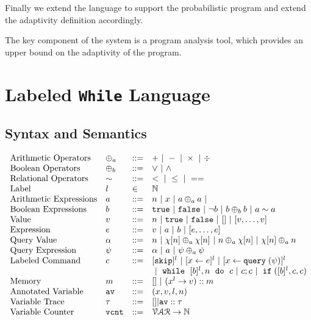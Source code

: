 \documentclass[a4paper,11pt]{article}
\begin{document}
Finally we extend the language to support the probabilistic program and extend the adaptivity definition accordingly.


The key component of the system is a program analysis tool, which provides an upper bound on the adaptivity of the program.

\section{Labeled {\tt While} Language}
\label{sec:while_language}
%
\subsection{Syntax and Semantics}
%
\[
\begin{array}{llll}
 \mbox{Arithmetic Operators} & \oplus_a & ::= & + ~|~ - ~|~ \times 
%
~|~ \div \\  
  \mbox{Boolean Operators} & \oplus_b & ::= & \lor ~|~ \land \\
   \mbox{Relational Operators} & \sim & ::= & < ~|~ \leq ~|~ == \\  
   \mbox{Label} & l & \in &  \mathbb{N}  \\  
\mbox{Arithmetic Expressions} & \aexpr & ::= & 
	n ~|~ x ~|~ \aexpr \oplus_a \aexpr ~|~ \\
\mbox{Boolean Expressions} & \bexpr & ::= & 
	\etrue ~|~ \efalse  ~|~ \neg \bexpr
	 ~|~ \bexpr \oplus_b \bexpr
	~|~ \aexpr \sim \aexpr \\
%
\mbox{Value} 
& v & ::= & { n \sep \etrue \sep \efalse ~|~ [] ~|~ [v, \dots, v]}  
\\
%
\mbox{Expression} 
& \expr & ::= & v ~|~ {\aexpr \sep \bexpr ~|~ [\expr, \dots, \expr]} 
\\
%
\mbox{Query Value} & \qval & ::= 
& {n ~|~ \chi[n] \oplus_a  \chi[n] ~|~ n \oplus_a  \chi[n]
~|~ \chi[n] \oplus_a  n}
\\
%
\mbox{Query Expression} 
& \qexpr & ::= 
& { \qval ~|~ \aexpr ~|~ \qexpr \oplus_a \qexpr} 
\\
\mbox{{Labeled Command}} & c & ::= 
	&  [\eskip]^{l}  ~|~ [\assign x \expr]^{l} ~|~  [\assign x \query(\qexpr)]^{l}
	\\
 	& & & ~|~  \ewhile ~ [b]^l, n ~ \edo ~ c  ~|~ c;c  ~|~ \eif([\bexpr]^l, c, c) 	 
 \\
\mbox{Memory} 
& m & ::= & [] ~|~ (x^{l} \to v) :: m 
\\
%
\mbox{Annotated Variable} 
& \av & ::= & (x, v, l, n)
\\
%
\mbox{Variable Trace} & \vtrace
& ::= & [] | \av :: \vtrace
\\
%
\mbox{Variable Counter} & \vcounter
& ::= & \mathcal{VAR} \to \mathbb{N}
\end{array}
\]
\end{document}
